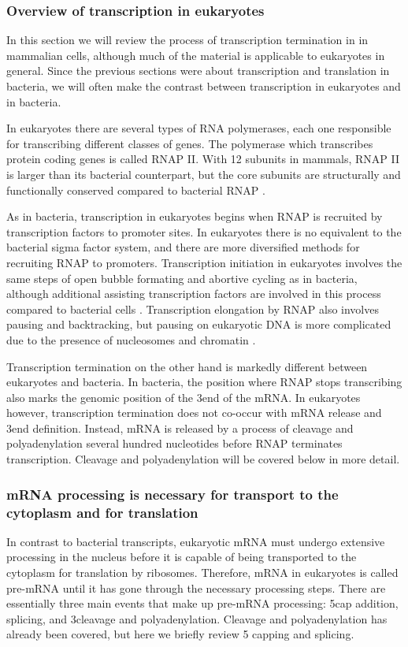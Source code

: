 %
\subsubsection{Overview of transcription in eukaryotes}
In this section we will review the process of transcription termination in in
mammalian cells, although much of the material is applicable to eukaryotes in
general. Since the previous sections were about transcription and translation
in bacteria, we will often make the contrast between transcription in
eukaryotes and in bacteria.

In eukaryotes there are several types of RNA polymerases, each one responsible
for transcribing different classes of genes. The polymerase which transcribes
protein coding genes is called RNAP II. With 12 subunits in mammals, RNAP II is
larger than its bacterial counterpart, but the core subunits are structurally
and functionally conserved compared to bacterial RNAP \cite{ebright_rna_2000}.

As in bacteria, transcription in eukaryotes begins when RNAP is recruited by
transcription factors to promoter sites. In eukaryotes there is no equivalent
to the bacterial sigma factor system, and there are more diversified methods
for recruiting RNAP to promoters. Transcription initiation in eukaryotes
involves the same steps of open bubble formating and abortive cycling as in
bacteria, although additional assisting transcription factors are involved in
this process compared to bacterial cells \cite{wade_transition_2008}.
Transcription elongation by RNAP also involves pausing and backtracking, but
pausing on eukaryotic DNA is more complicated due to the presence of
nucleosomes and chromatin \cite{sims_elongation_2004}.

Transcription termination on the other hand is markedly different between
eukaryotes and bacteria. In bacteria, the position where RNAP stops
transcribing also marks the genomic position of the 3\p end of the mRNA. In
eukaryotes however, transcription termination does not co-occur with mRNA
release and 3\p end definition. Instead, mRNA is released by a process of
cleavage and polyadenylation several hundred nucleotides before RNAP terminates
transcription. Cleavage and polyadenylation will be covered below in more
detail.

\subsubsection{mRNA processing is necessary for transport to the cytoplasm and
for translation}
In contrast to bacterial transcripts, eukaryotic mRNA must undergo extensive
processing in the nucleus before it is capable of being transported to the
cytoplasm for translation by ribosomes. Therefore, mRNA in eukaryotes is called
pre-mRNA until it has gone through the necessary processing steps. There are
essentially three main events that make up pre-mRNA processing: 5\p cap
addition, splicing, and 3\p cleavage and polyadenylation. Cleavage and
polyadenylation has already been covered, but here we briefly review 5\p
capping and splicing.

